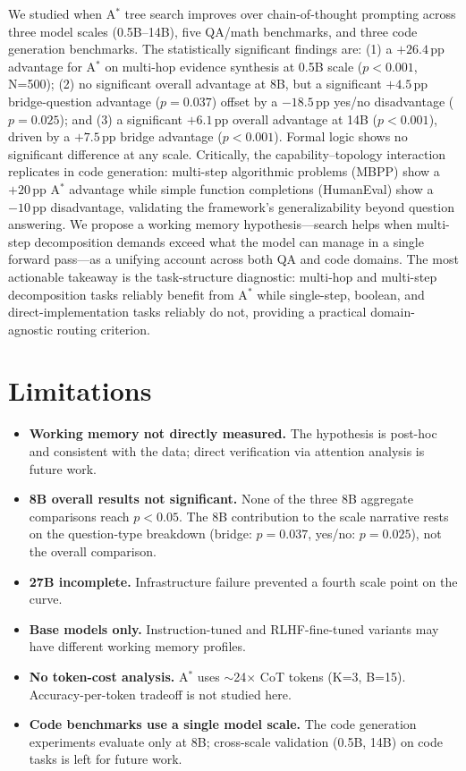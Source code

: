 \documentclass{article}
\newcommand{\astar}{A$^*$\xspace}
\begin{document}
We studied when \astar tree search improves over chain-of-thought prompting across three model scales (0.5B--14B), five QA/math benchmarks, and three code generation benchmarks.
The statistically significant findings are: (1) a $+26.4$\,pp advantage for \astar on multi-hop evidence synthesis at 0.5B scale ($p<0.001$, N=500); (2) no significant overall advantage at 8B, but a significant $+4.5$\,pp bridge-question advantage ($p=0.037$) offset by a $-18.5$\,pp yes/no disadvantage ($p=0.025$); and (3) a significant $+6.1$\,pp overall advantage at 14B ($p<0.001$), driven by a $+7.5$\,pp bridge advantage ($p<0.001$).
Formal logic shows no significant difference at any scale.
Critically, the capability--topology interaction replicates in code generation: multi-step algorithmic problems (MBPP) show a $+20$\,pp \astar advantage while simple function completions (HumanEval) show a $-10$\,pp disadvantage, validating the framework's generalizability beyond question answering.
We propose a working memory hypothesis---search helps when multi-step decomposition demands exceed what the model can manage in a single forward pass---as a unifying account across both QA and code domains.
The most actionable takeaway is the task-structure diagnostic: multi-hop and multi-step decomposition tasks reliably benefit from \astar while single-step, boolean, and direct-implementation tasks reliably do not, providing a practical domain-agnostic routing criterion.

\section*{Limitations}
\label{sec:limitations}

\begin{itemize}[leftmargin=*, noitemsep]
  \item \textbf{Working memory not directly measured.} The hypothesis is post-hoc and consistent with the data; direct verification via attention analysis is future work.
  \item \textbf{8B overall results not significant.} None of the three 8B aggregate comparisons reach $p<0.05$. The 8B contribution to the scale narrative rests on the question-type breakdown (bridge: $p=0.037$, yes/no: $p=0.025$), not the overall comparison.
  \item \textbf{27B incomplete.} Infrastructure failure prevented a fourth scale point on the curve.
  \item \textbf{Base models only.} Instruction-tuned and RLHF-fine-tuned variants may have different working memory profiles.
  \item \textbf{No token-cost analysis.} \astar uses $\sim$24$\times$ CoT tokens (K=3, B=15). Accuracy-per-token tradeoff is not studied here.
  \item \textbf{Code benchmarks use a single model scale.} The code generation experiments evaluate only at 8B; cross-scale validation (0.5B, 14B) on code tasks is left for future work.
\end{itemize}
\end{document}
